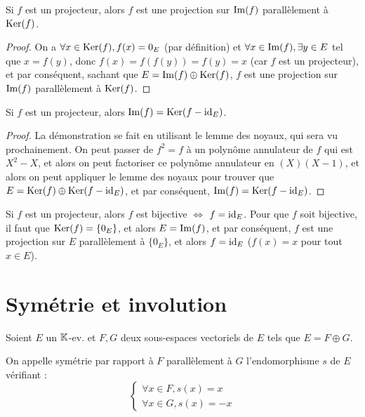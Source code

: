 \documentclass[12pt, a4paper]{report}
\begin{document}
\begin{remark}
    Si $f$ est un projecteur, alors $f$ est une projection sur $\mathrm{Im}(f)$ parallèlement à $\mathrm{Ker}(f)$.
\end{remark}

\begin{proof}
    On a $\forall x \in \mathrm{Ker}(f), f(x) = 0_E$ (par définition) et $\forall x \in \mathrm{Im}(f), \exists y \in E$ tel que $x = f(y)$, donc $f(x) = f(f(y)) = f(y) = x$ (car $f$ est un projecteur), et par conséquent, sachant que $E = \mathrm{Im}(f) \oplus \mathrm{Ker}(f)$, $f$ est une projection sur $\mathrm{Im}(f)$ parallèlement à $\mathrm{Ker}(f)$.
\end{proof}

\begin{remark}
    Si $f$ est un projecteur, alors $\mathrm{Im}(f) = \mathrm{Ker}(f - \mathrm{id}_E)$.
\end{remark}

\begin{proof}
    La démonstration se fait en utilisant le lemme des noyaux, qui sera vu prochainement. On peut passer de $f^2 = f$ à un polynôme annulateur de $f$ qui est $X^2 - X$, et alors on peut factoriser ce polynôme annulateur en $(X)(X-1)$, et alors on peut appliquer le lemme des noyaux pour trouver que $E = \mathrm{Ker}(f) \oplus \mathrm{Ker}(f - \mathrm{id}_E)$, et par conséquent, $\mathrm{Im}(f) = \mathrm{Ker}(f - \mathrm{id}_E)$.
\end{proof}

\begin{remark}
    Si $f$ est un projecteur, alors $f$ est bijective $\iff$ $f = \mathrm{id}_E$. Pour que $f$ soit bijective, il faut que $\mathrm{Ker}(f) = \{0_E\}$, et alors $E = \mathrm{Im}(f)$, et par conséquent, $f$ est une projection sur $E$ parallèlement à $\{0_E\}$, et alors $f = \mathrm{id}_E$ ($f(x) = x$ pour tout $x \in E$).
    
\end{remark}

\section{Symétrie et involution}

\begin{definition}[Symétrie]
    Soient $E$ un $\mathbb{K}$-ev. et $F,G$ deux sous-espaces vectoriels de $E$ tels que $E = F \oplus G$.

    On appelle symétrie par rapport à $F$ parallèlement à $G$ l'endomorphisme $s$ de $E$ vérifiant :
    $$\begin{cases}
    \forall x \in F, s(x) = x\\
    \forall x \in G, s(x) = -x
    \end{cases}$$
\end{definition}
\end{document}
